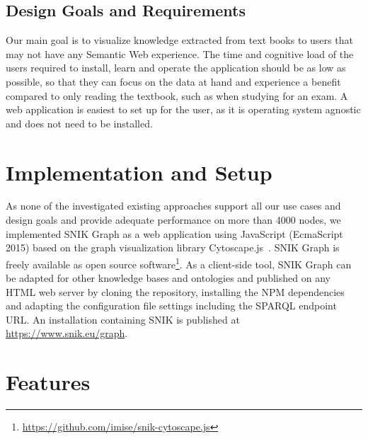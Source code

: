 \documentclass[conference]{IEEEtran}
\begin{document}
\subsection{Design Goals and Requirements}
Our main goal is to visualize knowledge extracted from text books to users that may not have any Semantic Web experience.
The time and cognitive load of the users required to install, learn and operate the application should be as low as possible, so that they can focus on the data at hand and experience a benefit compared to only reading the textbook, such as when studying for an exam.
A web application is easiest to set up for the user, as it is operating system agnostic and does not need to be installed.




\section{Implementation and Setup}
As none of the investigated existing approaches support all our use cases and design goals and provide adequate performance on more than 4000 nodes, we implemented SNIK Graph as a web application using JavaScript (EcmaScript 2015) based on the graph visualization library Cytoscape.js~\cite{cytoscape}.
SNIK Graph is freely available as open source software\footnote{\url{https://github.com/imise/snik-cytoscape.js}}.
As a client-side tool\footnotemark{}, SNIK Graph can be adapted for other knowledge bases and ontologies and published on any HTML web server by cloning the repository, installing the NPM dependencies and adapting the configuration file settings including the SPARQL endpoint URL.
%
An installation containing SNIK is published at \url{https://www.snik.eu/graph}.

\section{Features}
 
\end{document}
